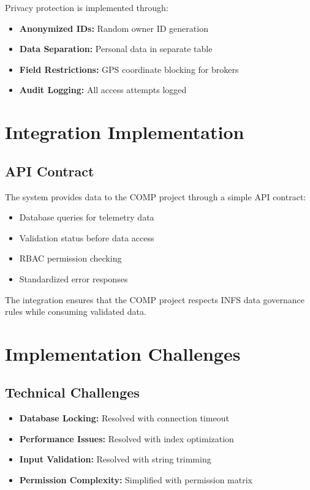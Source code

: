 Privacy protection is implemented through:

\begin{itemize}
    \item \textbf{Anonymized IDs:} Random owner ID generation
    \item \textbf{Data Separation:} Personal data in separate table
    \item \textbf{Field Restrictions:} GPS coordinate blocking for brokers
    \item \textbf{Audit Logging:} All access attempts logged
\end{itemize}

\section{Integration Implementation}

\subsection{API Contract}

The system provides data to the COMP project through a simple API contract:

\begin{itemize}
    \item Database queries for telemetry data
    \item Validation status before data access
    \item RBAC permission checking
    \item Standardized error responses
\end{itemize}

The integration ensures that the COMP project respects INFS data governance rules while consuming validated data.

\section{Implementation Challenges}

\subsection{Technical Challenges}

\begin{itemize}
    \item \textbf{Database Locking:} Resolved with connection timeout
    \item \textbf{Performance Issues:} Resolved with index optimization
    \item \textbf{Input Validation:} Resolved with string trimming
    \item \textbf{Permission Complexity:} Simplified with permission matrix
\end{itemize}

